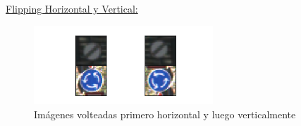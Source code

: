 \begin{multicols}{2}
\begin{figure}[H]
\begin{center}
				{\small{\fontsize{10}{16.8}\selectfont {Fuente: Elaboración propia}}}
					\end{center}
					\vspace{-1.5em}
				\end{figure}

			\end{multicols}

			\underline{Flipping Horizontal y Vertical:}
			\begin{figure}[H]
				\begin{center}
				\includegraphics[width=0.6\textwidth, height=0.3\textheight]{images/desarrollo/Augment/flippable_both}
				\end{center}
				\vspace{-1.em}
				\begin{center}
				\caption{\small{Imágenes volteadas primero horizontal y luego verticalmente}}
				{\small{\fontsize{10}{16.8}\selectfont {Fuente: Elaboración propia}}}
				\end{center}
				\vspace{-1.5em}
			\end{figure}

